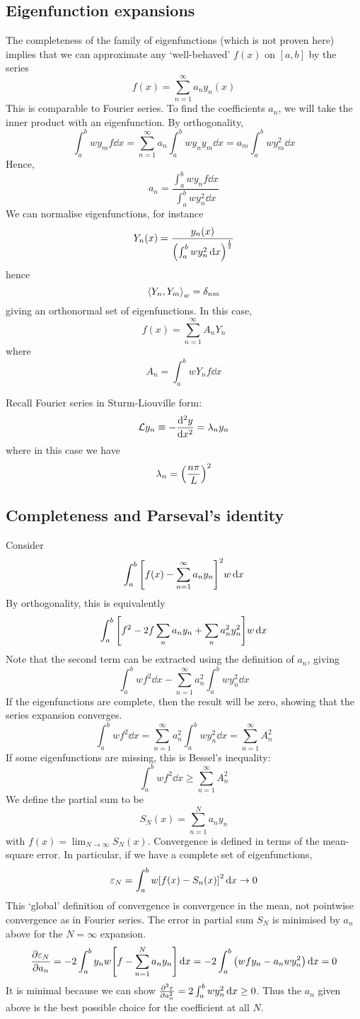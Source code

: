 \subsection{Eigenfunction expansions}
The completeness of the family of eigenfunctions (which is not proven here) implies that we can approximate any `well-behaved' \( f(x) \) on \( [a,b] \) by the series
\[
	f(x) = \sum_{n=1}^\infty a_n y_n(x)
\]
This is comparable to Fourier series.
To find the coefficients \( a_n \), we will take the inner product with an eigenfunction.
By orthogonality,
\[
	\int_a^b w y_m f \dd{x} = \sum_{n=1}^\infty a_n \int_a^b w y_n y_m \dd{x} = a_m \int_a^b w y_m^2 \dd{x}
\]
Hence,
\[
	a_n = \frac{\int_a^b w y_n f \dd{x}}{\int_a^b w y_n^2 \dd{x}}
\]
We can normalise eigenfunctions, for instance
\[
	Y_n(x) = \frac{y_n(x)}{\qty(\int_a^b w y_n^2 \dd{x})^{\frac{1}{2}}}
\]
hence
\[
	\left\langle{Y_n, Y_m}\right\rangle_w = \delta_{nm}
\]
giving an orthonormal set of eigenfunctions.
In this case,
\[
	f(x) = \sum_{n=1}^\infty A_n Y_n
\]
where
\[
	A_n = \int_a^b w Y_n f \dd{x}
\]
\begin{example}
	Recall Fourier series in Sturm-Liouville form:
	\[
		\mathcal L y_n \equiv - \dv[2]{y}{x} = \lambda_n y_n
	\]
	where in this case we have
	\[
		\lambda_n = \qty(\frac{n \pi}{L})^2
	\]
\end{example}

\subsection{Completeness and Parseval's identity}
Consider
\[
	\int_a^b \qty[ f(x) - \sum_{n=1}^\infty a_n y_n ]^2 w \dd{x}
\]
By orthogonality, this is equivalently
\[
	\int_a^b \qty[ f^2 - 2 f \sum_n a_n y_n + \sum_n a_n^2 y_n^2 ] w \dd{x}
\]
Note that the second term can be extracted using the definition of \( a_n \), giving
\[
	\int_a^b wf^2 \dd{x} - \sum_{n=1}^\infty a_n^2 \int_a^b w y_n^2 \dd{x}
\]
If the eigenfunctions are complete, then the result will be zero, showing that the series expansion converges.
\[
	\int_a^b w f^2 \dd{x} = \sum_{n=1}^\infty a_n^2 \int_a^b w y_n^2 \dd{x} = \sum_{n=1}^\infty A_n^2
\]
If some eigenfunctions are missing, this is Bessel's inequality:
\[
	\int_a^b w f^2 \dd{x} \geq \sum_{n=1}^\infty A_n^2
\]
We define the partial sum to be
\[
	S_N(x) = \sum_{n=1}^N a_n y_n
\]
with \( f(x) = \lim_{N \to \infty} S_N(x) \).
Convergence is defined in terms of the mean-square error.
In particular, if we have a complete set of eigenfunctions,
\[
	\varepsilon_N = \int_a^b w \qty[f(x) - S_n(x)]^2 \dd{x} \to 0
\]
This `global' definition of convergence is convergence in the mean, not pointwise convergence as in Fourier series.
The error in partial sum \( S_N \) is minimised by \( a_n \) above for the \( N = \infty \) expansion.
\[
	\pdv{\varepsilon_N}{a_n} = -2 \int_a^b y_n w \qty[ f - \sum_{n=1}^N a_n y_n ] \dd{x} = -2 \int_a^b \qty(wfy_n - a_n w y_n^2) \dd{x} = 0
\]
It is minimal because we can show \( \pdv[2]{\varepsilon}{a_n} = 2 \int_a^b w y_n^2 \dd{x} \geq 0 \).
Thus the \( a_n \) given above is the best possible choice for the coefficient at all \( N \).

